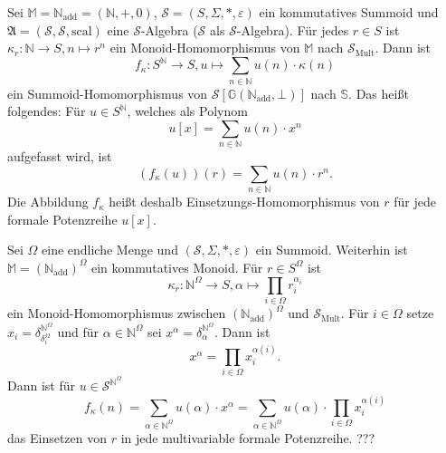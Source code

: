 \documentclass{article}
\begin{document}
\newpage

\begin{example}
  Sei $\mathbb{M} = \mathbb{N}_\text{add} = (\mathbb{N}, +, 0)$,
  $\mathcal{S} = (S, \Sigma, \ast, \varepsilon)$ ein kommutatives Summoid
  und $\mathfrak{A} = (\mathcal{S}, \mathcal{S}, \text{scal})$
  eine $\mathcal{S}$-Algebra ($\mathcal{S}$ als $\mathcal{S}$-Algebra).
  Für jedes $r \in S$ ist $\kappa_r \colon \mathbb{N} \to S, n \mapsto r^n$
  ein Monoid-Homomorphismus von $\mathbb{M}$ nach $\mathcal{S}_\text{Mult}$.
  Dann ist 
  \begin{equation*}
    f_\kappa \colon S^\mathbb{N} \to S, u \mapsto \sum_{n \in \mathbb{N}}u(n) \cdot \kappa(n)
  \end{equation*}
  ein Summoid-Homomorphismus von $\mathcal{S}[\mathbb{G}(\mathbb{N}_\text{add}, \bot)]$ nach $\mathbb{S}$.
  Das heißt folgendes: Für $u \in S^\mathbb{N}$, welches als Polynom
  \begin{equation*}
    u[x] = \sum_{n \in \mathbb{N}} u(n) \cdot x^n
  \end{equation*}
  aufgefasst wird, ist
  \begin{equation*}
    (f_\kappa(u))(r) = \sum_{n \in \mathbb{N}} u(n)\cdot r^n.
  \end{equation*}
  Die Abbildung $f_\kappa$ heißt deshalb Einsetzungs-Homomorphismus von $r$ für jede formale Potenzreihe $u[x]$.
\end{example}

\begin{example}
  Sei $\Omega$ eine endliche Menge
  und $(\mathcal{S}, \Sigma, \ast, \varepsilon)$ ein Summoid.
  Weiterhin ist $\mathbb{M} = (\mathbb{N}_\text{add})^\Omega$ ein kommutatives Monoid.
  Für $r \in S^\Omega$ ist 
  \begin{equation*}
    \kappa_r \colon \mathbb{N}^\Omega \to S, \alpha \mapsto \prod_{i \in \Omega}r_i^{\alpha_i}
  \end{equation*}
  ein Monoid-Homomorphismus zwischen $(\mathbb{N}_\text{add})^\Omega$ und $\mathcal{S}_\text{Mult}$.
  Für $i \in \Omega$ setze $x_i = \delta^{\mathbb{N}^\Omega}_{\delta^\Omega_i}$
  und für $\alpha \in \mathbb{N}^\Omega$ sei $x^\alpha = \delta^{\mathbb{N}^\Omega}_\alpha$.
  Dann ist
  \begin{equation*}
    x^\alpha = \prod_{i \in \Omega}x_i^{\alpha(i)}.
  \end{equation*}
  Dann ist für $u \in \mathcal{S}^{\mathbb{N}^\Omega}$
  \begin{equation*}
    f_\kappa(n) = \sum_{\alpha \in \mathbb{N}^\Omega}u(\alpha) \cdot x^\alpha = \sum_{\alpha \in \mathbb{N}^\Omega}u(\alpha)\cdot \prod_{i \in \Omega}x_i^{\alpha(i)}
  \end{equation*}
  das Einsetzen von $r$ in jede multivariable formale Potenzreihe.
  ???
\end{example}
\end{document}
